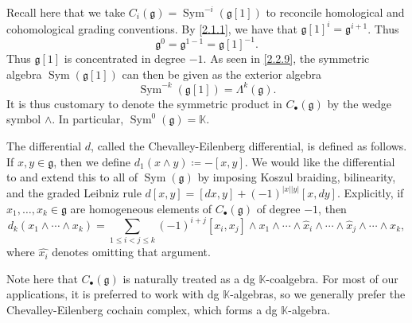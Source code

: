 \begin{discussion}\label{3.1.2}
	Recall here that we take $C_i(\mathfrak{g} )=\operatorname{Sym} ^{-i} (\mathfrak{g} [1])$ to reconcile homological and cohomological grading conventions. By \cref{2.1.1}, we have that $\mathfrak{g} [1]^i=\mathfrak{g} ^{i+1} $. Thus
	\[
		\mathfrak{g} ^0 = \mathfrak{g} ^{1-1} =\mathfrak{g} [1]^{-1} 
	.\]
	Thus $\mathfrak{g} [1]$ is concentrated in degree $-1$. As seen in \cref{2.2.9}, the symmetric algebra $\operatorname{Sym} (\mathfrak{g}[1] )$ can then be given as the exterior algebra
	\[
		\operatorname{Sym} ^{-k} (\mathfrak{g}[1] )=\Lambda ^k(\mathfrak{g} )
	.\]
	It is thus customary to denote the symmetric product in $C_{\bullet} (\mathfrak{g} )$ by the wedge symbol $\wedge $. In particular, $\operatorname{Sym} ^0(\mathfrak{g} )=\mathbb{K} $.

	The differential $d$, called the Chevalley-Eilenberg differential, is defined as follows. If $x,y\in \mathfrak{g} $, then we define $d_1(x\wedge y)\coloneqq-[x,y]$. We would like the differential to  and extend this to all of $\operatorname{Sym} (\mathfrak{g} )$ by imposing Koszul braiding, bilinearity, and the graded Leibniz rule $d[x,y]=[dx,y]+(-1)^{\left| x \right| \left| y \right| } [x,dy]$. Explicitly, if $x_1, \ldots ,x_k\in \mathfrak{g} $ are homogeneous elements of $C_{\bullet} (\mathfrak{g} )$ of degree $-1$, then
	\[
		d_k(x_1 \wedge \cdots \wedge x_k)=\sum_{1\leq i<j\leq k} (-1)^{i+j} [x_i,x_j]\wedge x_1 \wedge \cdots \wedge \widehat{x}_i\wedge \cdots \wedge \widehat{x}_j\wedge \cdots \wedge x_k,
	\]
	where $\widehat{x_i}$ denotes omitting that argument.

	Note here that $C_{\bullet} (\mathfrak{g} )$ is naturally treated as a dg $\mathbb{K}$-coalgebra. For most of our applications, it is preferred to work with dg $\mathbb{K} $-algebras, so we generally prefer the Chevalley-Eilenberg cochain complex, which forms a dg $\mathbb{K} $-algebra.
\end{discussion}
